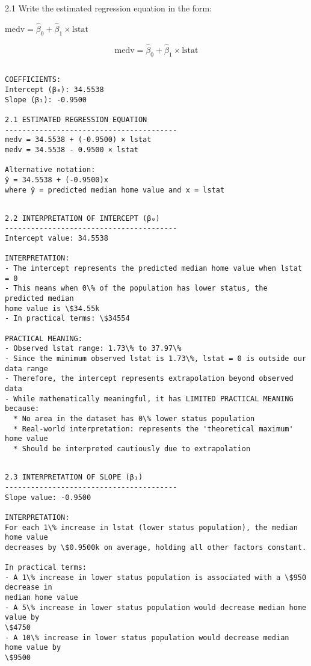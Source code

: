 \documentclass[11pt, twocolumn]{article}
\begin{document}
    2.1 Write the estimated regression equation in the form:

\(\text{medv} = \hat{\beta}_0 + \hat{\beta}_1 \times \text{lstat}\)

\[
\text{medv} = \hat{\beta}_0 + \hat{\beta}_1 \times \text{lstat}
\]

    \begin{Verbatim}[commandchars=\\\{\}]

COEFFICIENTS:
Intercept (β₀): 34.5538
Slope (β₁): -0.9500

2.1 ESTIMATED REGRESSION EQUATION
----------------------------------------
medv = 34.5538 + (-0.9500) × lstat
medv = 34.5538 - 0.9500 × lstat

Alternative notation:
ŷ = 34.5538 + (-0.9500)x
where ŷ = predicted median home value and x = lstat
    \end{Verbatim}

    \begin{Verbatim}[commandchars=\\\{\}]

2.2 INTERPRETATION OF INTERCEPT (β₀)
----------------------------------------
Intercept value: 34.5538

INTERPRETATION:
- The intercept represents the predicted median home value when lstat = 0
- This means when 0\% of the population has lower status, the predicted median
home value is \$34.55k
- In practical terms: \$34554

PRACTICAL MEANING:
- Observed lstat range: 1.73\% to 37.97\%
- Since the minimum observed lstat is 1.73\%, lstat = 0 is outside our data range
- Therefore, the intercept represents extrapolation beyond observed data
- While mathematically meaningful, it has LIMITED PRACTICAL MEANING because:
  * No area in the dataset has 0\% lower status population
  * Real-world interpretation: represents the 'theoretical maximum' home value
  * Should be interpreted cautiously due to extrapolation
    \end{Verbatim}

    \begin{Verbatim}[commandchars=\\\{\}]

2.3 INTERPRETATION OF SLOPE (β₁)
----------------------------------------
Slope value: -0.9500

INTERPRETATION:
For each 1\% increase in lstat (lower status population), the median home value
decreases by \$0.9500k on average, holding all other factors constant.

In practical terms:
- A 1\% increase in lower status population is associated with a \$950 decrease in
median home value
- A 5\% increase in lower status population would decrease median home value by
\$4750
- A 10\% increase in lower status population would decrease median home value by
\$9500
    \end{Verbatim}
\end{document}
